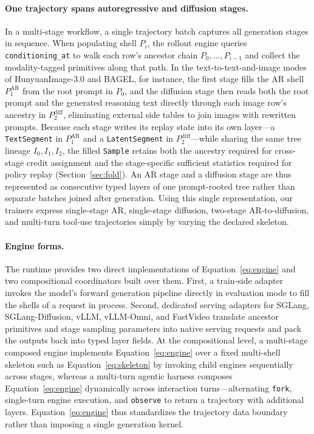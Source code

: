 \documentclass[10pt]{article}
\newcommand{\sample}{\texttt{Sample}}
\begin{document}
\paragraph{One trajectory spans autoregressive and diffusion stages.}
In a multi-stage workflow, a single trajectory batch captures all generation stages in sequence.
When populating shell $P_i$, the rollout engine queries \texttt{conditioning\_at} to walk each row's ancestor chain $P_0,\ldots,P_{i-1}$ and collect the modality-tagged primitives along that path.
In the text-to-text-and-image modes of HunyuanImage-3.0 and BAGEL, for instance, the first stage fills the AR shell $P_1^{\mathrm{AR}}$ from the root prompt in $P_0$, and the diffusion stage then reads both the root prompt and the generated reasoning text directly through each image row's ancestry in $P_2^{\mathrm{diff}}$, eliminating external side tables to join images with rewritten prompts.
Because each stage writes its replay state into its own layer---a \texttt{TextSegment} in $P_1^{\mathrm{AR}}$ and a \texttt{LatentSegment} in $P_2^{\mathrm{diff}}$---while sharing the same tree lineage $I_0, I_1, I_2$, the filled \sample{} retains both the ancestry required for cross-stage credit assignment and the stage-specific sufficient statistics required for policy replay (Section~\ref{sec:fold}).
An AR stage and a diffusion stage are thus represented as consecutive typed layers of one prompt-rooted tree rather than separate batches joined after generation.
Using this single representation, our trainers express single-stage AR, single-stage diffusion, two-stage AR-to-diffusion, and multi-turn tool-use trajectories simply by varying the declared skeleton.

\paragraph{Engine forms.}
The runtime provides two direct implementations of Equation~\ref{eq:engine} and two compositional coordinators built over them.
First, a train-side adapter invokes the model's forward generation pipeline directly in evaluation mode to fill the shells of a request in process.
Second, dedicated serving adapters for SGLang, SGLang-Diffusion, vLLM, vLLM-Omni, and FastVideo translate ancestor primitives and stage sampling parameters into native serving requests and pack the outputs back into typed layer fields.
At the compositional level, a multi-stage composed engine implements Equation~\ref{eq:engine} over a fixed multi-shell skeleton such as Equation~\ref{eq:skeleton} by invoking child engines sequentially across stages, whereas a multi-turn agentic harness composes Equation~\ref{eq:engine} dynamically across interaction turns---alternating \texttt{fork}, single-turn engine execution, and \texttt{observe} to return a trajectory with additional layers.
Equation~\ref{eq:engine} thus standardizes the trajectory data boundary rather than imposing a single generation kernel.
\end{document}
